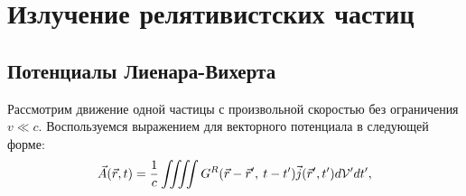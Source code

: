 \newpage
\section{Излучение релятивистских частиц}
\subsection{Потенциалы Лиенара-Вихерта}
    Рассмотрим движение одной частицы с произвольной скоростью без ограничения $v \ll c$. Воспользуемся выражением для векторного потенциала в
    следующей форме:
    \begin{equation}
        \vec{A}(\vec{r}, t) = \frac 1c \iiiint G^R(\vec{r} - \vec{r}', \: t - t') \vec{j}(\vec{r}', t')d\mathcal{V}'dt', \label{vec_pot_rel}
    \end{equation}
    
